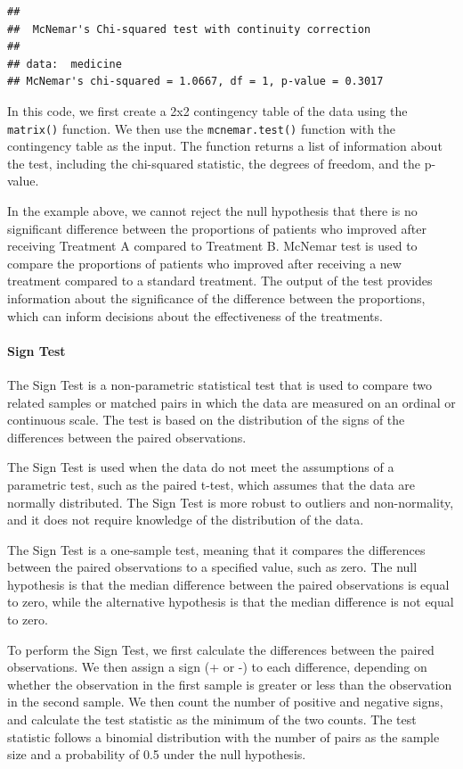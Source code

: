 \documentclass[
]{ctexart}
\begin{document}
\begin{verbatim}
## 
##  McNemar's Chi-squared test with continuity correction
## 
## data:  medicine
## McNemar's chi-squared = 1.0667, df = 1, p-value = 0.3017
\end{verbatim}

In this code, we first create a 2x2 contingency table of the data using
the \texttt{matrix()} function. We then use the \texttt{mcnemar.test()}
function with the contingency table as the input. The function returns a
list of information about the test, including the chi-squared statistic,
the degrees of freedom, and the p-value.

In the example above, we cannot reject the null hypothesis that there is
no significant difference between the proportions of patients who
improved after receiving Treatment A compared to Treatment B. McNemar
test is used to compare the proportions of patients who improved after
receiving a new treatment compared to a standard treatment. The output
of the test provides information about the significance of the
difference between the proportions, which can inform decisions about the
effectiveness of the treatments.

\hypertarget{sign-test}{%
\paragraph{Sign Test}\label{sign-test}}

The Sign Test is a non-parametric statistical test that is used to
compare two related samples or matched pairs in which the data are
measured on an ordinal or continuous scale. The test is based on the
distribution of the signs of the differences between the paired
observations.

The Sign Test is used when the data do not meet the assumptions of a
parametric test, such as the paired t-test, which assumes that the data
are normally distributed. The Sign Test is more robust to outliers and
non-normality, and it does not require knowledge of the distribution of
the data.

The Sign Test is a one-sample test, meaning that it compares the
differences between the paired observations to a specified value, such
as zero. The null hypothesis is that the median difference between the
paired observations is equal to zero, while the alternative hypothesis
is that the median difference is not equal to zero.

To perform the Sign Test, we first calculate the differences between the
paired observations. We then assign a sign (+ or -) to each difference,
depending on whether the observation in the first sample is greater or
less than the observation in the second sample. We then count the number
of positive and negative signs, and calculate the test statistic as the
minimum of the two counts. The test statistic follows a binomial
distribution with the number of pairs as the sample size and a
probability of 0.5 under the null hypothesis.
\end{document}
